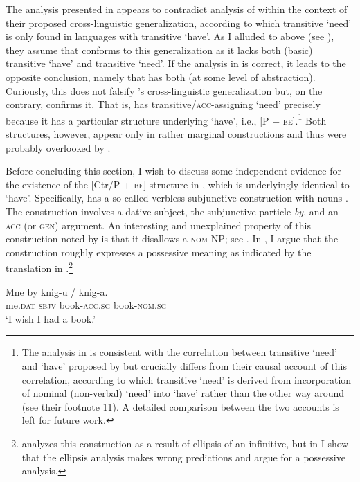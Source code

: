 \documentclass[output=paper]{langscibook}
\begin{document}
The analysis presented in  appears to contradict  analysis of  within the context of their proposed cross-linguistic generalization, according to which transitive `need' is only found in languages with transitive `have'. As I alluded to above (see ), they assume that  conforms to this generalization as it lacks both (basic) transitive `have' and transitive `need'. If the analysis in  is correct, it leads to the opposite conclusion, namely that  has both (at some level of abstraction). Curiously, this does not falsify \citeauthor{Harves.Kayne2012}'s cross-linguistic generalization but, on the contrary, confirms it. That is,  has transitive/\textsc{acc}-assigning `need' precisely because it has a particular structure underlying `have', i.e., [P + \textsc{be}].\footnote{The analysis in  is consistent with the correlation between transitive `need' and `have' proposed by \citet{Harves.Kayne2012} but crucially differs from their causal account of this correlation, according to which transitive `need' is derived from incorporation of nominal (non-verbal) `need' into `have' rather than the other way around (see their footnote 11). A detailed comparison between the two accounts is left for future work.} Both structures, however, appear only in rather marginal constructions and thus were probably overlooked by \citet{Harves.Kayne2012}.

Before concluding this section, I wish to discuss some independent evidence for the existence of the [Ctr/P + \textsc{be}] structure in , which is underlyingly identical to `have'. Specifically,  has a so-called verbless subjunctive construction with nouns \citep[see][]{Dobrushina2015}. The construction involves a dative subject, the subjunctive particle \textit{by}, and an \textsc{acc} (or \textsc{gen}) argument. An interesting and unexplained property of this construction noted by \citet{Dobrushina2015} is that it disallows a \textsc{nom}-NP; see . In \citet{Knyazev2020}, I argue that the construction roughly expresses a possessive meaning as indicated by the translation in .\footnote{\citet{Dobrushina2015} analyzes this construction as a result of ellipsis of an infinitive, but in \citet{Knyazev2020} I show that the ellipsis analysis makes wrong predictions and argue for a possessive analysis.}

\ea \label{by}
\gll Mne by knig-u / \minsp{*} knig-a.\\
me.\textsc{dat} \textsc{sbjv} book-\textsc{acc.sg} {} {} book-\textsc{nom.sg}\\
\glt `I wish I had a book.'
\z
\end{document}

